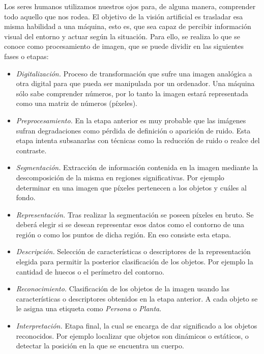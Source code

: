 Los seres humanos utilizamos nuestros ojos para, de alguna manera, comprender todo aquello que nos rodea. El objetivo de la visión artificial es trasladar esa misma habilidad a una máquina, esto es, que sea capaz de percibir información visual del entorno y actuar según la situación. Para ello, se realiza lo que se conoce como procesamiento de imagen, que se puede dividir en las siguientes fases o etapas:

\begin{itemize}
    \item \textit{Digitalización.} Proceso de transformación que sufre una imagen analógica a otra digital para que pueda ser manipulada por un ordenador. Una máquina sólo sabe comprender números, por lo tanto la imagen estará representada como una matriz de números (píxeles).
    
    \item \textit{Preprocesamiento.} En la etapa anterior es muy probable que las imágenes sufran degradaciones como pérdida de definición o aparición de ruido. Esta etapa intenta subsanarlas con técnicas como la reducción de ruido o realce del contraste.
    
    \item \textit{Segmentación.} Extracción de información contenida en la imagen mediante la descomposición de la misma en regiones significativas. Por ejemplo determinar en una imagen que píxeles pertenecen a los objetos y cuáles al fondo.
    
    \item \textit{Representación.} Tras realizar la segmentación se poseen píxeles en bruto. Se deberá elegir si se desean representar esos datos como el contorno de una región o como los puntos de dicha región. En eso consiste esta etapa.
    
    \item \textit{Descripción.} Selección de características o descriptores de la representación elegida para permitir la posterior clasificación de los objetos. Por ejemplo la cantidad de huecos o el perímetro del contorno.
    
    \item \textit{Reconocimiento.} Clasificación de los objetos de la imagen usando las características o descriptores obtenidos en la etapa anterior. A cada objeto se le asigna una etiqueta como \textit{Persona} o \textit{Planta}.
    
    \item \textit{Interpretación.} Etapa final, la cual se encarga de dar significado a los objetos reconocidos. Por ejemplo localizar que objetos son dinámicos o estáticos, o detectar la posición en la que se encuentra un cuerpo.
\end{itemize}

